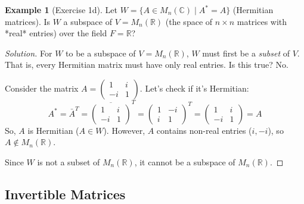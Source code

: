 \documentclass[11pt]{article}
\theoremstyle{definition}
\newtheorem{example}[theorem]{Example}
\theoremstyle{remark}
\begin{document}
\begin{example}[Exercise 1d]
Let $W = \{ A \in M_n(\mathbb{C}) \mid A^* = A \}$ (Hermitian matrices). Is $W$ a subspace of $V = M_n(\mathbb{R})$ (the space of $n \times n$ matrices with *real* entries) over the field $F=\mathbb{R}$?

\begin{proof}[Solution]
For $W$ to be a subspace of $V=M_n(\mathbb{R})$, $W$ must first be a \emph{subset} of $V$. That is, every Hermitian matrix must have only real entries. Is this true? No.

Consider the matrix $A = \begin{pmatrix} 1 & i \\ -i & 1 \end{pmatrix}$.
Let's check if it's Hermitian:
\[ A^* = \bar{A}^T = \overline{\begin{pmatrix} 1 & i \\ -i & 1 \end{pmatrix}}^T = \begin{pmatrix} 1 & -i \\ i & 1 \end{pmatrix}^T = \begin{pmatrix} 1 & i \\ -i & 1 \end{pmatrix} = A \]
So, $A$ is Hermitian ($A \in W$). However, $A$ contains non-real entries ($i, -i$), so $A \notin M_n(\mathbb{R})$.

Since $W$ is not a subset of $M_n(\mathbb{R})$, it cannot be a subspace of $M_n(\mathbb{R})$.
\end{proof}
\end{example}

\subsection{Invertible Matrices}
\end{document}
